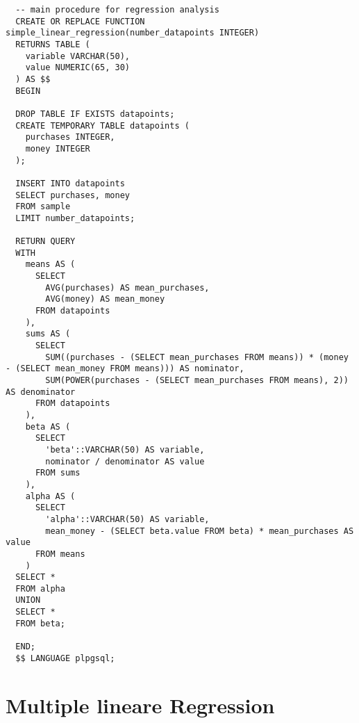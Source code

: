 \begin{verbatim}
  -- main procedure for regression analysis
  CREATE OR REPLACE FUNCTION simple_linear_regression(number_datapoints INTEGER)
  RETURNS TABLE (
    variable VARCHAR(50),
    value NUMERIC(65, 30)
  ) AS $$
  BEGIN

  DROP TABLE IF EXISTS datapoints;
  CREATE TEMPORARY TABLE datapoints (
    purchases INTEGER,
    money INTEGER
  );

  INSERT INTO datapoints
  SELECT purchases, money
  FROM sample
  LIMIT number_datapoints;

  RETURN QUERY
  WITH
    means AS (
      SELECT
        AVG(purchases) AS mean_purchases,
        AVG(money) AS mean_money
      FROM datapoints
    ),
    sums AS (
      SELECT
        SUM((purchases - (SELECT mean_purchases FROM means)) * (money - (SELECT mean_money FROM means))) AS nominator,
        SUM(POWER(purchases - (SELECT mean_purchases FROM means), 2)) AS denominator
      FROM datapoints
    ),
    beta AS (
      SELECT
        'beta'::VARCHAR(50) AS variable,
        nominator / denominator AS value
      FROM sums
    ),
    alpha AS (
      SELECT
        'alpha'::VARCHAR(50) AS variable,
        mean_money - (SELECT beta.value FROM beta) * mean_purchases AS value
      FROM means
    )
  SELECT *
  FROM alpha
  UNION
  SELECT *
  FROM beta;

  END;
  $$ LANGUAGE plpgsql;
\end{verbatim}

\section{Multiple lineare Regression}
\label{appendix:E:2}

